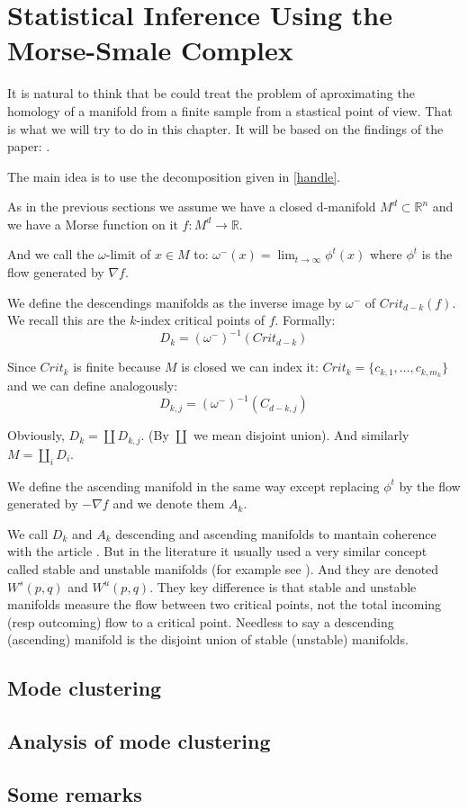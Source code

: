 \chapter{Statistical Inference Using the
Morse-Smale Complex}

It is natural to think that be could treat the problem
of aproximating the homology of a manifold from a finite 
sample from a stastical point of view. 
That is what we will try to do in this chapter. It will be based on the findings of the paper: \cite{che2017}.

The main idea is to use the decomposition given in \ref{handle}.

As in the previous sections we assume we have a closed d-manifold $M^d\subset \mathbb{R}^n$
and we have a Morse function on it $f:M^d\rightarrow \mathbb{R}$.

And we call the $\omega$-limit of $x\in M$ to:
$\omega^-(x)=\displaystyle\lim_{t\to \infty} \phi^t(x)$ where $\phi^t$ is 
the flow generated by $\nabla f$.

We define the descendings manifolds as the inverse image by $\omega^-$ of $Crit_{d-k}(f)$. 
We recall this are the $k$-index critical points of $f$.
Formally:
$$
D_k=
(\omega^-)^{-1}(Crit_{d-k})
$$

Since $Crit_k$ is finite because $M$ is closed we can index it:
$Crit_k=\{c_{k,1},\ldots,c_{k,m_k}\}$ and we can define analogously:
$$
D_{k,j}=
(\omega^-)^{-1}(C_{d-k,j})
$$

Obviously, $D_k=\coprod D_{k,j}$. (By $\coprod$ we mean disjoint union). And similarly
$M=\coprod_i D_i$.

We define the ascending manifold in the same way except replacing $\phi^t$ by the flow generated by $-\nabla f$
and we denote them $A_k$.

\begin{remark}
We call $D_k$ and $A_k$
descending and ascending manifolds to mantain coherence with the article \cite{che2017}.
But in the literature it usually used a very similar concept called stable and unstable manifolds (for example
see \cite{che2014}).
And they are denoted $W^s(p,q)$ and $W^u(p,q)$.
They key difference is that stable and unstable manifolds measure the flow between two critical points, not the total
incoming (resp outcoming) flow to a critical point. Needless to say a descending (ascending) manifold is the disjoint 
union of stable (unstable) manifolds.
\end{remark}

\section{Mode clustering}


\section{Analysis of mode clustering}


\section{Some remarks}

